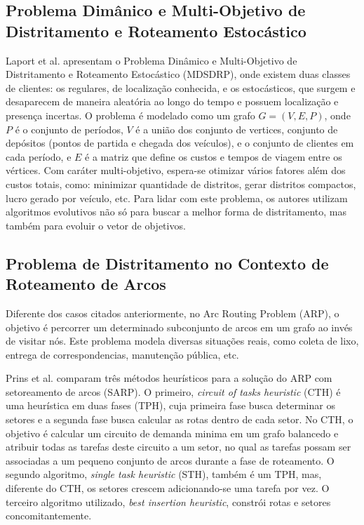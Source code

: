 \documentclass[12pt]{elsarticle}
\begin{document}
	\subsection{Problema Dimânico e Multi-Objetivo de Distritamento e Roteamento Estocástico} \label{districtingAndRouting}
    Laport et al. \cite{wang} apresentam o Problema Dinâmico e Multi-Objetivo de Distritamento e Roteamento Estocástico (MDSDRP), onde existem duas classes de clientes: os regulares, de localização conhecida, e os estocásticos, que surgem e desaparecem de maneira aleatória ao longo do tempo e possuem localização e presença incertas. O problema é modelado como um grafo $G=(V,E,P)$, onde $P$ é o conjunto de períodos, $V$ é a união dos conjunto de vertices, conjunto de depósitos (pontos de partida e chegada dos veículos), e o conjunto de clientes em cada período, e $E$ é a matriz que define os custos e tempos de viagem entre os vértices. Com caráter multi-objetivo, espera-se otimizar vários fatores além dos custos totais, como: minimizar quantidade de distritos, gerar distritos compactos, lucro gerado por veículo, etc. Para lidar com este problema, os autores utilizam algoritmos evolutivos não só para buscar a melhor forma de distritamento, mas também para evoluir o vetor de objetivos. 
    
    \subsection{Problema de Distritamento no Contexto de Roteamento de Arcos}
    Diferente dos casos citados anteriormente, no Arc Routing Problem (ARP), o objetivo é percorrer um determinado subconjunto de arcos em um grafo ao invés de visitar nós. Este problema modela diversas situações reais, como coleta de lixo, entrega de correspondencias, manutenção pública, etc. 
    
    Prins et al. \cite{prins} comparam três métodos heurísticos para a solução do ARP com setoreamento de arcos (SARP). O primeiro, \textit{circuit of tasks heuristic} (CTH) é uma heurística em duas fases (TPH), cuja primeira fase busca determinar os setores e a segunda fase busca calcular as rotas dentro de cada setor. No CTH, o objetivo é calcular um circuito de demanda minima em um grafo balancedo e atribuir todas as tarefas deste circuito a um setor, no qual as tarefas possam ser associadas a um pequeno conjunto de arcos durante a fase de roteamento. O segundo algoritmo, \textit{single task heuristic} (STH), também é um TPH, mas, diferente do CTH, os setores crescem adicionando-se uma tarefa por vez. O terceiro algoritmo utilizado, \textit{best insertion heuristic}, constrói rotas e setores concomitantemente.
    
\end{document}
